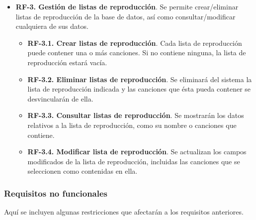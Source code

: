 \begin{itemize}
	\item \textbf{RF-3. Gestión de listas de reproducción}. Se permite crear/eliminar listas de reproducción de la base de datos, así como consultar/modificar cualquiera de sus datos.
	\begin{itemize}
		\item \textbf{RF-3.1. Crear listas de reproducción}. Cada lista de reproducción puede contener una o más canciones. Si no contiene ninguna, la lista de reproducción estará vacía.
		\item \textbf{RF-3.2. Eliminar listas de reproducción}. Se eliminará del sistema la lista de reproducción indicada y las canciones que ésta pueda contener se desvincularán de ella.
		\item \textbf{RF-3.3. Consultar listas de reproducción}. Se mostrarán los datos relativos a la lista de reproducción, como su nombre o canciones que contiene.
		\item \textbf{RF-3.4. Modificar lista de reproducción}. Se actualizan los campos modificados de la lista de reproducción, incluidas las canciones que se seleccionen como contenidas en ella.
	\end{itemize}	 
\end{itemize}
\subsubsection{Requisitos no funcionales}
Aquí se incluyen algunas restricciones que afectarán a los requisitos anteriores.

